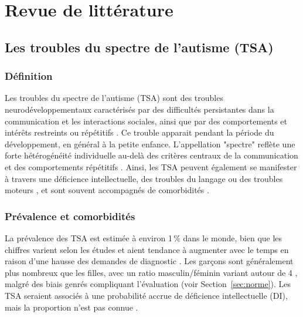 
\chapter{Revue de littérature}
\section{Les troubles du spectre de l'autisme (TSA)}
\subsection{Définition}
Les troubles du spectre de l'autisme (TSA) sont des troubles neurodéveloppementaux caractérisés par des difficultés persistantes dans la communication et les interactions sociales, ainsi que par des comportements et intérêts restreints ou répétitifs \parencite[p.~56–58]{apa_diagnostic_2022}.
Ce trouble apparait pendant la période du développement, en général à la petite enfance. L'appellation "spectre" reflète une forte hétérogénéité individuelle au-delà des critères centraux de la communication et des comportements répétitifs \parencite{oms_classification_2018}. Ainsi, les TSA peuvent également se manifester à travers une déficience intellectuelle, des troubles du langage ou des troubles moteurs \parencite[p.~62]{apa_diagnostic_2022}, et sont souvent accompagnés de comorbidités \parencites[p.~67–68]{apa_diagnostic_2022}{lord_autism_2018}.



\subsection{Prévalence et comorbidités} \label{sec:prev_comor}
La prévalence des TSA est estimée à environ 1\,\% dans le monde, bien que les chiffres varient selon les études et aient tendance à augmenter avec le temps en raison d'une hausse des demandes de diagnostic \parencite{zeidan_global_2022, brugha_epidemiology_2011, Elsabbagh2012Apr}.
Les garçons sont généralement plus nombreux que les filles, avec un ratio masculin/féminin variant autour de 4 \parencite{zeidan_global_2022}, malgré des biais genrés compliquant l'évaluation (voir Section~\ref{sec:norme}). Les TSA seraient associés à une probabilité accrue de déficience intellectuelle (DI), mais la proportion n'est pas connue \parencite{zeidan_global_2022}.

